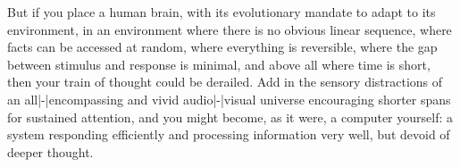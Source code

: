 But if you place a human brain, with its evolutionary mandate to adapt to its
environment, in an environment where there is no obvious linear sequence, where
facts can be accessed at random, where everything is reversible, where the gap
between stimulus and response is minimal, and above all where time is short, then
your train of thought could be derailed. Add in the sensory distractions of an
all|-|encompassing and vivid audio|-|visual universe encouraging shorter spans
for sustained attention, and you might become, as it were, a computer yourself: a
system responding efficiently and processing information very well, but devoid of
deeper thought.
